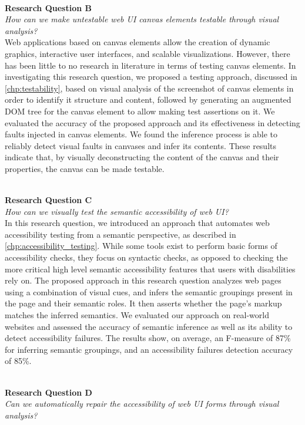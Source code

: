 \ \\ 
\textbf{Research Question B} \\
\textit{How can we make untestable web UI canvas elements testable through visual 
	analysis?
}
\\ 

Web applications based on canvas elements allow the creation of dynamic graphics, 
interactive user interfaces, and scalable visualizations. However, there has been 
little to no research in literature in terms of testing canvas elements. In investigating 
this research question, we proposed a testing approach, discussed in \autoref{chp:testability}, based 
on visual analysis of the screenshot of canvas elements in order to identify it structure 
and content, followed by generating an augmented DOM tree for the canvas element to allow making test assertions on it.
We evaluated the accuracy of the proposed approach and its
effectiveness in detecting faults injected in canvas elements.
We found the inference process is able to reliably 
detect visual faults in canvases and infer its contents. These results indicate that, by visually deconstructing 
the content of the canvas and their properties, the canvas can be made testable. 


\ \\ 
\textbf{Research Question C} \\
\textit{How can we visually test the semantic accessibility of web UI?}
\\ 

In this research question, we introduced 
an approach that automates web accessibility testing from a
semantic perspective, as described in \autoref{chp:accessibility_testing}. 
While some tools exist to perform basic forms of accessibility
checks, they focus on syntactic checks, as opposed to checking
the more critical high level semantic accessibility features that
users with disabilities rely on. 
The proposed approach in this research question analyzes web pages using a combination of visual cues, and infers the semantic groupings present in the page and their semantic roles. It then asserts
whether the page’s markup matches the inferred semantics. We
evaluated our approach on real-world websites and assessed
the accuracy of semantic inference as well as its ability to
detect accessibility failures. The results show, on average, an
F-measure of 87\% for inferring semantic groupings, and an
accessibility failures detection accuracy of 85\%.



\ \\ 
\textbf{Research Question D} \\
\textit{Can we automatically repair the accessibility of web UI forms through 
	visual analysis?}
\\ 

